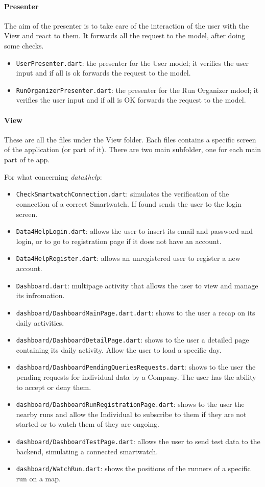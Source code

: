 \paragraph{Presenter}
The aim of the presenter is to take care of the interaction of the user with the View and react to them. It forwards all the request to the model, after doing some checks.
\begin{itemize}
    \item \texttt{UserPresenter.dart}: the presenter for the User model; it verifies the user input and if all is ok forwards the request to the model.
    \item \texttt{RunOrganizerPresenter.dart}: the presenter for the Run Organizer mdoel; it verifies the user input and if all is OK forwards the request to the model.
\end{itemize}

\paragraph{View} These are all the files under the View folder. Each files contains a specific screen of the application (or part of it). There are two main subfolder, one for each main part of te app.

For what concerning \textit{data4help}:
\begin{itemize}
    \item \texttt{CheckSmartwatchConnection.dart}: simulates the verification of the connection of a correct Smartwatch. If found sends the user to the login screen.
    \item \texttt{Data4HelpLogin.dart}: allows the user to insert its email and password and login, or to go to registration page if it does not have an account.
    \item \texttt{Data4HelpRegister.dart}: allows an unregistered user to register a new account.
    \item \texttt{Dashboard.dart}: multipage activity that allows the user to view and manage its infromation.
    \item \texttt{dashboard/DashboardMainPage.dart.dart}: shows to the user a recap on its daily activities.
    \item \texttt{dashboard/DashboardDetailPage.dart}: shows to the user a detailed page containing its daily activity. Allow the user to load a specific day.
    \item \texttt{dashboard/DashboardPendingQueriesRequests.dart}: shows to the user the pending requests for individual data by a Company. The user has the ability to accept or deny them.
    \item \texttt{dashboard/DashboardRunRegistrationPage.dart}: shows to the user the nearby runs and allow the Individual to subscribe to them if they are not started or to watch them of they are ongoing.
    \item \texttt{dashboard/DashboardTestPage.dart}: allows the user to send test data to the backend, simulating a connected smartwatch.
    \item \texttt{dashboard/WatchRun.dart}: shows the positions of the runners of a specific run on a map.
\end{itemize}

